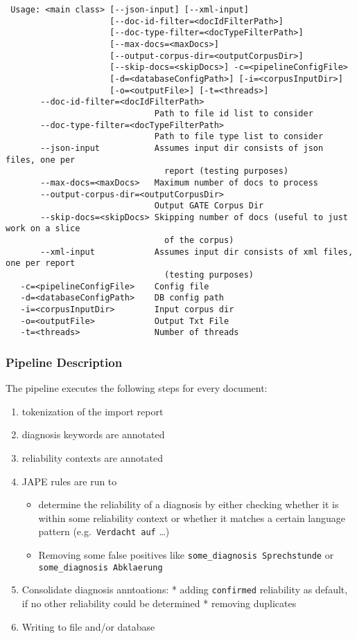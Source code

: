 \begin{verbatim}
 Usage: <main class> [--json-input] [--xml-input]
                     [--doc-id-filter=<docIdFilterPath>]
                     [--doc-type-filter=<docTypeFilterPath>]
                     [--max-docs=<maxDocs>]
                     [--output-corpus-dir=<outputCorpusDir>]
                     [--skip-docs=<skipDocs>] -c=<pipelineConfigFile>
                     [-d=<databaseConfigPath>] [-i=<corpusInputDir>]
                     [-o=<outputFile>] [-t=<threads>]
       --doc-id-filter=<docIdFilterPath>
                              Path to file id list to consider
       --doc-type-filter=<docTypeFilterPath>
                              Path to file type list to consider
       --json-input           Assumes input dir consists of json files, one per
                                report (testing purposes)
       --max-docs=<maxDocs>   Maximum number of docs to process
       --output-corpus-dir=<outputCorpusDir>
                              Output GATE Corpus Dir
       --skip-docs=<skipDocs> Skipping number of docs (useful to just work on a slice
                                of the corpus)
       --xml-input            Assumes input dir consists of xml files, one per report
                                (testing purposes)
   -c=<pipelineConfigFile>    Config file
   -d=<databaseConfigPath>    DB config path
   -i=<corpusInputDir>        Input corpus dir
   -o=<outputFile>            Output Txt File
   -t=<threads>               Number of threads
\end{verbatim}

\subsubsection{Pipeline Description}\label{pipeline-description}

The pipeline executes the following steps for every document:

\begin{enumerate}
\def\labelenumi{\arabic{enumi}.}
\tightlist
\item
  tokenization of the import report
\item
  diagnosis keywords are annotated
\item
  reliability contexts are annotated
\item
  JAPE rules are run to

  \begin{itemize}
  \tightlist
  \item
    determine the reliability of a diagnosis by either checking whether
    it is within some reliability context or whether it matches a
    certain language pattern (e.g.~\texttt{Verdacht\ auf} \ldots)
  \item
    Removing some false positives like
    \texttt{some\_diagnosis\ Sprechstunde} or
    \texttt{some\_diagnosis\ Abklaerung}
  \end{itemize}
\item
  Consolidate diagnosis anntoations: * adding \texttt{confirmed}
  reliability as default, if no other reliability could be determined *
  removing duplicates
\item
  Writing to file and/or database
\end{enumerate}
